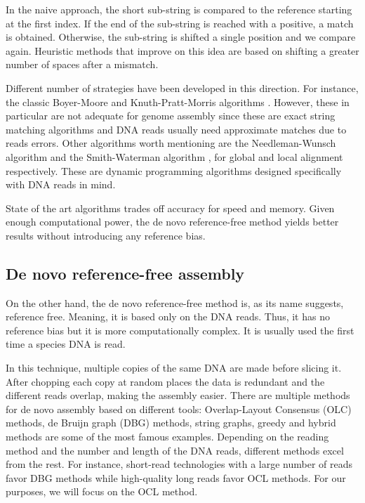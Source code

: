 In the naive approach, the short sub-string is compared to the reference starting at the first index. If the end of the sub-string is reached with a positive, a match is obtained. Otherwise, the sub-string is shifted a single position and we compare again. Heuristic methods that improve on this idea are based on shifting a greater number of spaces after a mismatch.

Different number of strategies have been developed in this direction. For instance, the classic Boyer-Moore and Knuth-Pratt-Morris algorithms \cite{Holmes1999}. However, these in particular are not adequate for genome assembly since these are exact string matching algorithms and DNA reads usually need approximate matches due to reads errors. Other algorithms worth mentioning are the Needleman-Wunsch algorithm \cite{Needleman1970} and the Smith-Waterman algorithm \cite{Smith1981}, for global and local alignment respectively. These are dynamic programming algorithms designed specifically with DNA reads in mind. 

State of the art algorithms trades off accuracy for speed and memory. Given enough computational power, the de novo reference-free method yields better results without introducing any reference bias.


\subsection{De novo reference-free assembly}
\label{sec:de-novo-genome-assembly}

On the other hand, the de novo reference-free method is, as its name suggests, reference free. Meaning, it is based only on the DNA reads. Thus, it has no reference bias but it is more computationally complex. It is usually used the first time a species DNA is read.

In this technique, multiple copies of the same DNA are made before slicing it. After chopping each copy at random places the data is redundant and the different reads overlap, making the assembly easier. There are multiple methods for de novo assembly based on different tools: Overlap-Layout Consensus (OLC) methods, de Bruijn graph (DBG) methods, string graphs, greedy and hybrid methods are some of the most famous examples. Depending on the reading method and the number and length of the DNA reads, different methods excel from the rest. For instance, short-read technologies with a large number of reads favor DBG methods while high-quality long reads favor OCL methods. For our purposes, we will focus on the OCL method.

